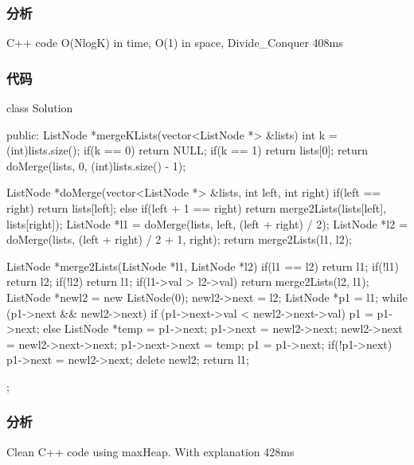 \subsubsection{分析}
C++ code O(NlogK) in time, O(1) in space, Divide_Conquer 408ms

\subsubsection{代码}
\begin{Code}
class Solution {
public:
    ListNode *mergeKLists(vector<ListNode *> &lists) {
        int k = (int)lists.size();
        if(k == 0) return NULL;
        if(k == 1) return lists[0];
        return doMerge(lists, 0, (int)lists.size() - 1);
    }


    ListNode *doMerge(vector<ListNode *> &lists, int left, int right) {
        if(left == right) return lists[left];
        else if(left + 1 == right) return merge2Lists(lists[left], lists[right]);
        ListNode *l1 = doMerge(lists, left, (left + right) / 2);
        ListNode *l2 = doMerge(lists, (left + right) / 2 + 1, right);
        return merge2Lists(l1, l2);
    }


    ListNode *merge2Lists(ListNode *l1, ListNode *l2) {
        if(l1 == l2) return l1;
        if(!l1) return l2;
        if(!l2) return l1;
        if(l1->val > l2->val) return merge2Lists(l2, l1);
        ListNode *newl2 = new ListNode(0);
        newl2->next = l2;
        ListNode *p1 = l1;
        while (p1->next && newl2->next) {
            if (p1->next->val < newl2->next->val) {
                p1 = p1->next;
            } else {
                ListNode *temp = p1->next;
                p1->next = newl2->next;
                newl2->next = newl2->next->next;
                p1->next->next = temp;
                p1 = p1->next;
            }
        }
        if(!p1->next) p1->next = newl2->next;
        delete newl2;
        return l1;
    }
};
\end{Code}

\subsubsection{分析}
Clean C++ code using maxHeap. With explanation 428ms


